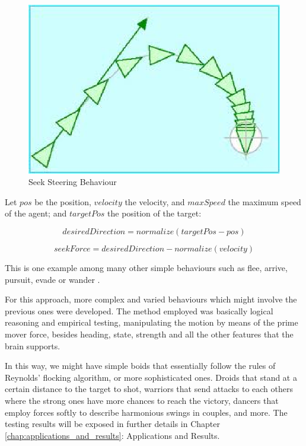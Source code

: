 \begin{figure}[!h]
  \centering
  \label{fig:f2}\includegraphics[scale=0.7]{seek_02.eps}
  \caption{Seek Steering Behaviour}
  \label{fig:crowds}
\end{figure}

Let $pos$ be the position, $velocity$ the velocity, and $maxSpeed$ the maximum speed of the agent; and $targetPos$ the position of the target:

\begin{equation}
	desiredDirection=normalize(targetPos-pos) 
\end{equation}

\begin{equation}
	seekForce=desiredDirection-normalize(velocity)
\end{equation}

This is one example among many other simple behaviours such as flee, arrive, pursuit, evade or wander \citep{buckland}. 

For this approach, more complex and varied behaviours which might involve the previous ones were developed. The method employed was basically logical reasoning and empirical testing, manipulating the motion by means of the prime mover force, besides heading, state, strength and all the other features that the brain supports.

In this way, we might have simple boids that essentially follow the rules of Reynolds' flocking algorithm, or more sophisticated ones. Droids that stand at a certain distance to the target to shot, warriors that send attacks to each others where the strong ones have more chances to reach the victory, dancers that employ forces softly to describe harmonious swings in couples, and more. The testing results will be exposed in further details in Chapter \ref{chap:applications_and_results}: Applications and Results.

\ifx\isEmbedded\undefined


\pagebreak

\fi